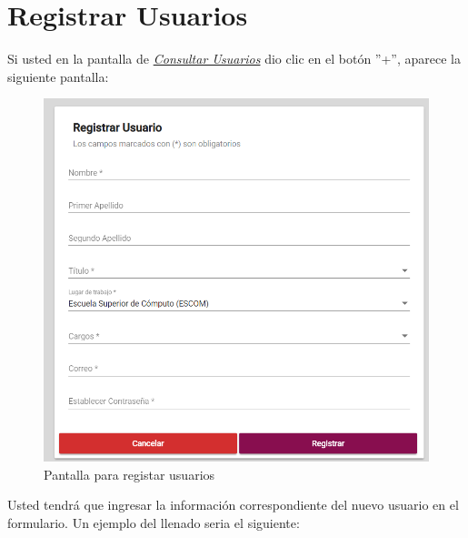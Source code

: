         

    \newpage
        
        \section{Registrar Usuarios} 
            Si usted  en la pantalla de \hyperlink{consultarUs}{\textit{Consultar Usuarios}} dio clic en el botón ''+'', aparece la siguiente pantalla:
            
            \begin{figure}[!hbtp]
                \centering
                \hypertarget{registrarUs}{\includegraphics[width=0.7\linewidth]{images/SP5/Registro-Usuario-vacio}}
                \caption{Pantalla para registar usuarios}
                \label{registrarrh}
            \end{figure}
            
            Usted tendrá que ingresar la información correspondiente del nuevo usuario en el formulario. Un ejemplo del llenado seria el siguiente:
        
